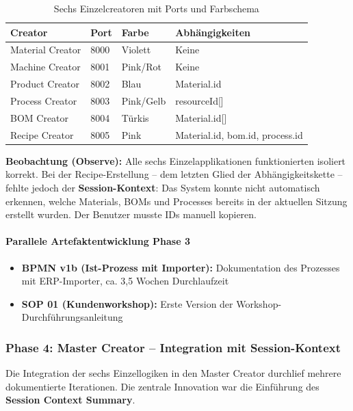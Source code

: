 \begin{table}[h]
\centering
\caption{Sechs Einzelcreatoren mit Ports und Farbschema}
\label{tab:Einzelcreatoren}
\begin{tabular}{llll}
\hline
\textbf{Creator} & \textbf{Port} & \textbf{Farbe} & \textbf{Abhängigkeiten} \\
\hline
Material Creator & 8000 & Violett & Keine \\
Machine Creator & 8001 & Pink/Rot & Keine \\
Product Creator & 8002 & Blau & Material.id \\
Process Creator & 8003 & Pink/Gelb & resourceId[] \\
BOM Creator & 8004 & Türkis & Material.id[] \\
Recipe Creator & 8005 & Pink & Material.id, bom.id, process.id \\
\hline
\end{tabular}
\end{table}

\textbf{Beobachtung (Observe):} Alle sechs Einzelapplikationen funktionierten isoliert korrekt. Bei der Recipe-Erstellung -- dem letzten Glied der Abhängigkeitskette -- fehlte jedoch der \textbf{Session-Kontext}: Das System konnte nicht automatisch erkennen, welche Materials, BOMs und Processes bereits in der aktuellen Sitzung erstellt wurden. Der Benutzer musste IDs manuell kopieren.

\paragraph{Parallele Artefaktentwicklung Phase 3}

\begin{itemize}
    \item \textbf{BPMN v1b (Ist-Prozess mit Importer):} Dokumentation des Prozesses mit ERP-Importer, ca. 3,5 Wochen Durchlaufzeit
    \item \textbf{SOP 01 (Kundenworkshop):} Erste Version der Workshop-Durchführungsanleitung
\end{itemize}


\subsubsection{Phase 4: Master Creator -- Integration mit Session-Kontext}
\label{subsubsec:Phase4}

Die Integration der sechs Einzellogiken in den Master Creator durchlief mehrere dokumentierte Iterationen. Die zentrale Innovation war die Einführung des \textbf{Session Context Summary}.

